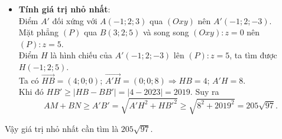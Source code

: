 \begin{ex}
{\begin{itemize}
		- Nhận xét rằng $A'$ cố định và $B'$ di động. Ta sẽ tìm vị trí của $B'$ để $A'B'$ đạt giá trị nhỏ nhất.\\
		- Vì $B$ cố định, $BB'\parallel (Oxy)$ và $BB'=MN=2023$ nên $B'$ di động trên đường tròn $(C)$ tâm $B$, bán kính $R=2023$ và nằm trong mặt phẳng $(P)\parallel (Oxy)$.\\
		Gọi $H$ là hình chiếu của $A'$ lên $(P)$. Ta có $A'$, $H$, $B$ cố định nên $A'H$, $HB$ không đổi.\\
		Khi đó
		\[A'B'=\sqrt{A'H^2 + HB'^2} \Rightarrow A'B'_{\min}\Leftrightarrow HB'_{\min}=|HB - BB'|.\]
		\item {\bf Tính giá trị nhỏ nhất}:\\
		Điểm $A'$ đối xứng với $A(-1;2;3)$ qua $(Oxy)$ nên $A'(-1;2;-3)$.\\
		Mặt phẳng $(P)$ qua $B(3;2;5)$ và song song $(Oxy)\colon z=0$ nên $(P)\colon z=5$.\\
		Điểm $H$ là hình chiếu của $A'(-1;2;-3)$ lên $(P)\colon z=5$, ta tìm được $H(-1;2;5)$.\\
		Ta có $\overrightarrow{HB}=(4;0;0)$; $\overrightarrow{A'H}=(0;0;8)\Rightarrow HB=4$; $A'H=8$.\\
		Khi đó $HB'\geq |HB-BB'|=|4-2023|=2019$.
		Suy ra
		 \[AM +BN \geq A'B' =\sqrt{A'H^2 + HB'^2}\geq \sqrt{8^2 +2019^2}=205\sqrt{97}.\]
	\end{itemize}
	Vậy giá trị nhỏ nhất cần tìm là $205\sqrt{97}$.
	}
\end{ex}

